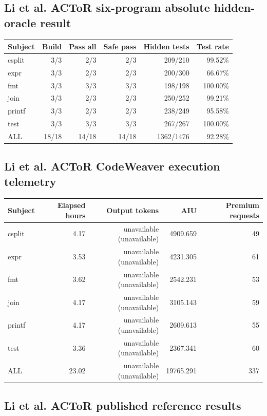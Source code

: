 \documentclass{article}
\begin{document}
\subsection*{Li et al. ACToR six-program absolute hidden-oracle result}

\begin{tabular}{lrrrrr}
\toprule
Subject & Build & Pass all & Safe pass & Hidden tests & Test rate \\
\midrule
csplit & 3/3 & 2/3 & 2/3 & 209/210 & 99.52\% \\
expr & 3/3 & 2/3 & 2/3 & 200/300 & 66.67\% \\
fmt & 3/3 & 3/3 & 3/3 & 198/198 & 100.00\% \\
join & 3/3 & 2/3 & 2/3 & 250/252 & 99.21\% \\
printf & 3/3 & 2/3 & 2/3 & 238/249 & 95.58\% \\
test & 3/3 & 3/3 & 3/3 & 267/267 & 100.00\% \\
ALL & 18/18 & 14/18 & 14/18 & 1362/1476 & 92.28\% \\
\bottomrule
\end{tabular}

\subsection*{Li et al. ACToR CodeWeaver execution telemetry}

\begin{tabular}{lrrrr}
\toprule
Subject & Elapsed hours & Output tokens & AIU & Premium requests \\
\midrule
csplit & 4.17 & unavailable (unavailable) & 4909.659 & 49 \\
expr & 3.53 & unavailable (unavailable) & 4231.305 & 61 \\
fmt & 3.62 & unavailable (unavailable) & 2542.231 & 53 \\
join & 4.17 & unavailable (unavailable) & 3105.143 & 59 \\
printf & 4.17 & unavailable (unavailable) & 2609.613 & 55 \\
test & 3.36 & unavailable (unavailable) & 2367.341 & 60 \\
ALL & 23.02 & unavailable (unavailable) & 19765.291 & 337 \\
\bottomrule
\end{tabular}

\subsection*{Li et al. ACToR published reference results}
\end{document}
